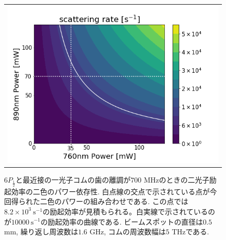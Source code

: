 \documentclass[uplatex, dvipdfmx, a4paper, report, papersize, 11pt]{jsbook}
\begin{document}
\begin{figure}[H]
  \centering
    \begin{tabular}{c}
      \begin{minipage}{1\hsize}
        \centering
          \includegraphics[keepaspectratio,  scale=0.5,  angle=0]
          {figures/chapter4/rityounashi_result.png}
          \caption{$6P_{\frac{1}{2}}$と最近接の一光子コムの歯の離調が$700$ MHzのときの二光子励起効率の二色のパワー依存性. 白点線の交点で示されている点が今回得られた二色のパワーの組み合わせである. この点では$8.2\times 10^3\ \mathrm{s^{-1}}$の励起効率が見積もられる。白実線で示されているのが$10000\ \mathrm{s^{-1}}$の励起効率の曲線である. ビームスポットの直径は$0.5$ mm, 繰り返し周波数は$1.6$ GHz, コムの周波数幅は$5$ THzである.}
          \label{result-colorplot}
      \end{minipage}
    \end{tabular}
\end{figure}


\end{document}
